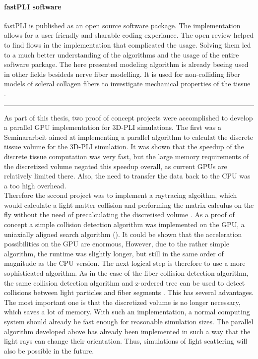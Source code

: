 \paragraph{\acs{fastPLI} software}%
\ac{fastPLI} is published as an open source software package.
The \python{} implementation allows for a user friendly and sharable coding experiance.
The open review helped to find flows in the implementation that complicated the usage.
Solving them led to a much better understanding of the algorithms and the usage of the entire software package.
The here presented modeling algorithm is already beeing used in other fields besideds nerve fiber modelling.
It is used for non-colliding fiber models of scleral collagen fibers to investigate mechanical properties of the tissue \cite{Ji2021}.
% 
\par
\noindent\rule{\textwidth}{2pt}
\par
% 
As part of this thesis, two proof of concept projects were accomplished to develop a parallel \ac{GPU} implementation for \ac{3D-PLI} simulations.
The first was a Seminararbeit aimed at implementing a parallel algorithm to calculat the discrete tissue volume for the \ac{3D-PLI} simulation\cite{Kobusch:Seminar}.
It was shown that the speedup of the discrete tissue computation was very fast, but the large memory requirements of the discretized volume negated this speedup overall, as current \acp{GPU} are relatively limited there.
Also, the need to transfer the data back to the \ac{CPU} was a too high overhead.\\
Therefore the second project was to implement a raytracing algoithm, which would calculate a light matter collision and performing the matrix calculus on the fly without the need of precalculating the discretised volume \cite{Kobusch:887783}.
As a proof of concept a simple collision detection algorithm was implemented on the \ac{GPU}, a uniaxially aligned search algorithm (\cite{Karras2012}).
It could be shown that the acceleration possibilities on the \ac{GPU} are enormous,
However, due to the rather simple algorithm, the runtime was slightly longer, but still in the same order of magnitude as the \ac{CPU} version.
The next logical step is therefore to use a more sophisticated algorithm.
As in the case of the fiber collision detection algorithm, the same collision detection algorithm and z-ordered tree can be used to detect collisions between light particles and fiber segments \cite{Karras2012}.
This has several advantages.
The most important one is that the discretized volume is no longer necessary, which saves a lot of memory.
With such an implementation, a normal computing system should already be fast enough for reasonable simulation sizes.
The parallel algorithm developed above has already been implemented in such a way that the light rays can change their orientation.
Thus, simulations of light scattering will also be possible in the future.